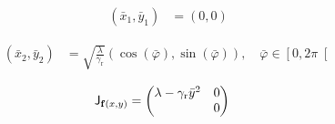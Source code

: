 \documentclass[a4paper,10pt]{article}
\newcommand{\gammar}{\gamma_{\text{r}}}
\begin{document}
\begin{align}
	(\bar{x}_1,\bar{y}_1)
	&=
	(0,0)
\end{align}

\begin{align}
	(\bar{x}_2,\bar{y}_2)
	&=
	\sqrt{\frac{\lambda}{\gammar}}
	(\cos(\bar{\varphi}),\sin(\bar{\varphi})),
	\quad
	\bar{\varphi}\in\left[0,2\pi\right[
\end{align}

\begin{align}
	\mathsf{J}_{\vb{f}(x,y)}
	&=
	\pmqty{
		\lambda
		-
		\gammar
		\bar{y}^2
		&
		0
		\\
		&
		0
	}
\end{align}
\end{document}
